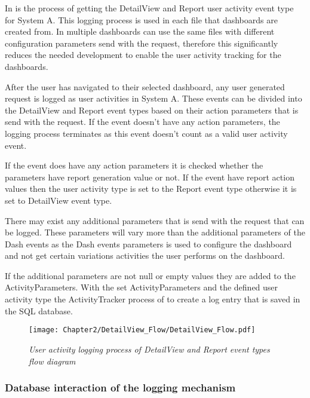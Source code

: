 In  is the process of getting the DetailView and Report user activity event type for System A. This logging process is used in each file that dashboards are created from. In  multiple dashboards can use the same files with different configuration parameters send with the request, therefore this significantly reduces the needed development to enable the user activity tracking for the dashboards.\par After the user has navigated to their selected dashboard, any user generated request is logged as user activities in System A. These events can be divided into the DetailView and Report event types based on their action parameters that is send with the request. If the event doesn't have any action parameters, the logging process terminates as this event doesn't count as a valid user activity event.\par If the event does have any action parameters it is checked whether the parameters have report generation value or not. If the event have report action values then the user activity type is set to the Report event type otherwise it is set to DetailView event type.\par There may exist any additional parameters that is send with the request that can be logged. These parameters will vary more than the additional parameters of the Dash events as the Dash events parameters is used to configure the dashboard and not get certain variations activities the user performs on the dashboard.\par If the additional parameters are not null or empty values they are added to the ActivityParameters. With the set ActivityParameters and the defined user activity type the ActivityTracker process of  to create a log entry that is saved in the SQL database.

\begin{figure}[!htb] %
	\centering %
	\texttt{[image: Chapter2/DetailView\_Flow/DetailView\_Flow.pdf]}
	\caption[User activity logging of DetailView and Report event types]
	{\textit{User activity logging process of DetailView and Report event types flow diagram}}\label{fig:ch2_DetailView_Flow}
\end{figure}

\clearpage

\subsubsection{Database interaction of the logging mechanism}\label{sec:CH2_SystemA_DB_Interaction_FlowDiagram}


